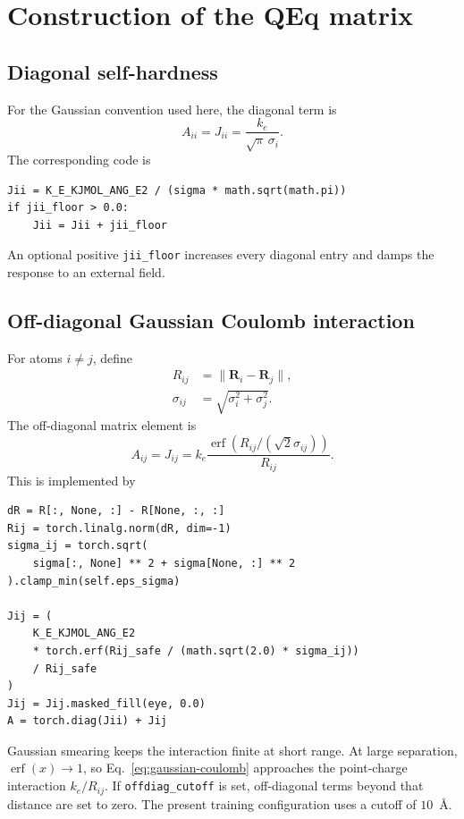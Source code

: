 \documentclass[11pt,a4paper]{article}
\newcommand{\vect}[1]{\bm{#1}}
\begin{document}
\section{Construction of the QEq matrix}

\subsection{Diagonal self-hardness}

For the Gaussian convention used here, the diagonal term is
\begin{equation}
  A_{ii}=J_{ii}=\frac{k_e}{\sqrt{\pi}\,\sigma_i}.
  \label{eq:self-hardness}
\end{equation}
The corresponding code is
\begin{lstlisting}[style=pythonstyle]
Jii = K_E_KJMOL_ANG_E2 / (sigma * math.sqrt(math.pi))
if jii_floor > 0.0:
    Jii = Jii + jii_floor
\end{lstlisting}
An optional positive \texttt{jii\_floor} increases every diagonal entry and
damps the response to an external field.

\subsection{Off-diagonal Gaussian Coulomb interaction}

For atoms $i\ne j$, define
\begin{align}
  R_{ij} &= \lVert\vect R_i-\vect R_j\rVert,\\
  \sigma_{ij} &= \sqrt{\sigma_i^2+\sigma_j^2}.
\end{align}
The off-diagonal matrix element is
\begin{equation}
  A_{ij}=J_{ij}
  =k_e\frac{\operatorname{erf}\!\left(
      R_{ij}/(\sqrt{2}\sigma_{ij})\right)}{R_{ij}}.
  \label{eq:gaussian-coulomb}
\end{equation}
This is implemented by
\begin{lstlisting}[style=pythonstyle]
dR = R[:, None, :] - R[None, :, :]
Rij = torch.linalg.norm(dR, dim=-1)
sigma_ij = torch.sqrt(
    sigma[:, None] ** 2 + sigma[None, :] ** 2
).clamp_min(self.eps_sigma)

Jij = (
    K_E_KJMOL_ANG_E2
    * torch.erf(Rij_safe / (math.sqrt(2.0) * sigma_ij))
    / Rij_safe
)
Jij = Jij.masked_fill(eye, 0.0)
A = torch.diag(Jii) + Jij
\end{lstlisting}
Gaussian smearing keeps the interaction finite at short range.  At large
separation, $\operatorname{erf}(x)\rightarrow1$, so Eq.~\eqref{eq:gaussian-coulomb}
approaches the point-charge interaction $k_e/R_{ij}$.  If
\texttt{offdiag\_cutoff} is set, off-diagonal terms beyond that distance are set
to zero.  The present training configuration uses a cutoff of $10$~\AA.
\end{document}
